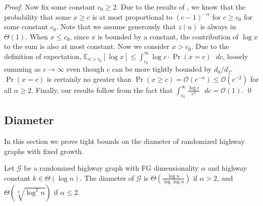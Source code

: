 \begin{proof}
    Now fix some constant $c_0 \geq 2$. 
    Due to the results of , we know that the
    probability that some $x \geq c$ is at most proportional to $(c -
    1)^{-\alpha}$ for $c \geq c_0$ for some constant $c_0$.
    Note that we assume generously that $z(u)$ is always in $\Theta(1)$.
    When $x \leq c_0$, since $x$ is bounded by a constant, the contribution of
    $\log{x}$ to the sum is also at most constant.
    Now we consider $x > c_0$.
    Due to the definition of expectation, $\mathbb{E}_{x >
    c_0}[\log{x}] \leq \int_{c_0}^{\infty}{\log{c} \cdot \Pr(x = c) \text{ } dc}$, loosely
    summing as $c \to \infty$ even though $c$ can be more tightly bounded by
    $d_0 / d_f$.
    $\Pr(x = c)$ is certainly no greater than $\Pr(x \geq c) =
    \mathcal{O}(c^{-\alpha}) \leq \mathcal{O}(c^{-2})$ for all $\alpha \geq 2$.
    Finally, our results follow from the fact that
    $\int_{c_0}^{\infty}{\frac{\log{c}}{c^2} \text{ } dc} =
    \mathcal{O}(1)$.
    \qed
\end{proof}

\subsection{Diameter}

In this section we prove tight bounds on the diameter of randomized highway
graphs with fixed growth.
%
\begin{theorem} \label{thm:diameter}
    Let $\mathcal{G}$ be a randomized highway graph with FG dimensionality
    $\alpha$ and highway constant $k \in \Theta(\log{n})$.
    The diameter of $\mathcal{G}$ is $\Theta(\frac{\log{n}}{\log{\log{n}}})$ if
    $\alpha > 2$, and $\Theta(\sqrt[\alpha]{\log^2{n}})$ if $\alpha \leq 2$.
\end{theorem}

